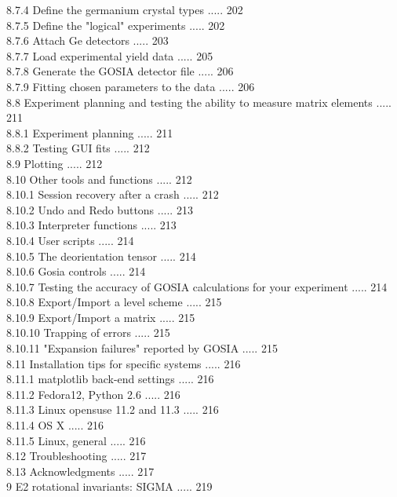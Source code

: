 \documentclass[10pt]{article}
\begin{document}
8.7.4 Define the germanium crystal types ..... 202\\
8.7.5 Define the "logical" experiments ..... 202\\
8.7.6 Attach Ge detectors ..... 203\\
8.7.7 Load experimental yield data ..... 205\\
8.7.8 Generate the GOSIA detector file ..... 206\\
8.7.9 Fitting chosen parameters to the data ..... 206\\
8.8 Experiment planning and testing the ability to measure matrix elements ..... 211\\
8.8.1 Experiment planning ..... 211\\
8.8.2 Testing GUI fits ..... 212\\
8.9 Plotting ..... 212\\
8.10 Other tools and functions ..... 212\\
8.10.1 Session recovery after a crash ..... 212\\
8.10.2 Undo and Redo buttons ..... 213\\
8.10.3 Interpreter functions ..... 213\\
8.10.4 User scripts ..... 214\\
8.10.5 The deorientation tensor ..... 214\\
8.10.6 Gosia controls ..... 214\\
8.10.7 Testing the accuracy of GOSIA calculations for your experiment ..... 214\\
8.10.8 Export/Import a level scheme ..... 215\\
8.10.9 Export/Import a matrix ..... 215\\
8.10.10 Trapping of errors ..... 215\\
8.10.11 "Expansion failures" reported by GOSIA ..... 215\\
8.11 Installation tips for specific systems ..... 216\\
8.11.1 matplotlib back-end settings ..... 216\\
8.11.2 Fedora12, Python 2.6 ..... 216\\
8.11.3 Linux opensuse 11.2 and 11.3 ..... 216\\
8.11.4 OS X ..... 216\\
8.11.5 Linux, general ..... 216\\
8.12 Troubleshooting ..... 217\\
8.13 Acknowledgments ..... 217\\
9 E2 rotational invariants: SIGMA ..... 219\\
\end{document}
